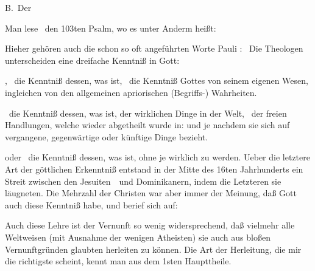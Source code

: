 \begin{aufza}
\vabst B.~Der \par
Man lese \zB\ den 103ten Psalm, wo es unter Anderm heißt:\par
{}\par
Hieher gehören auch die schon so oft angeführten Worte Pauli :  \usw\ Die Theologen unterscheiden eine dreifache Kenntniß in Gott:
\begin{aufzb}
\item {}, \dh\ die Kenntniß dessen, was  ist, \zB\ die Kenntniß Gottes von seinem eigenen Wesen, ingleichen von den allgemeinen apriorischen (Begriffs-) Wahrheiten.
\item {} \dh\ die Kenntniß dessen, was  ist, der wirklichen Dinge in der Welt, \zB\ der freien Handlungen, welche wieder abgetheilt wurde in:  und  je nachdem sie sich auf vergangene, gegenwärtige oder künftige Dinge bezieht.
\item {} oder  \dh\ die Kenntniß dessen, was  ist, ohne je wirklich zu werden. Ueber die letztere Art der göttlichen Erkenntniß entstand in der Mitte des 16ten Jahrhunderts ein Streit zwischen den Jesuiten~\ und Dominikanern, indem die Letzteren sie läugneten. Die Mehrzahl der Christen war aber immer der Meinung, daß Gott auch diese Kenntniß habe, und berief sich auf: \ \ \ \ 
\end{aufzb}
\end{aufza}

Auch diese Lehre ist der Vernunft so wenig widersprechend, daß vielmehr alle Weltweisen (mit Ausnahme der wenigen Atheisten) sie auch aus bloßen Vernunftgründen glaubten herleiten zu können. Die Art der Herleitung, die mir die richtigste scheint, kennt man aus dem 1sten Haupttheile.

